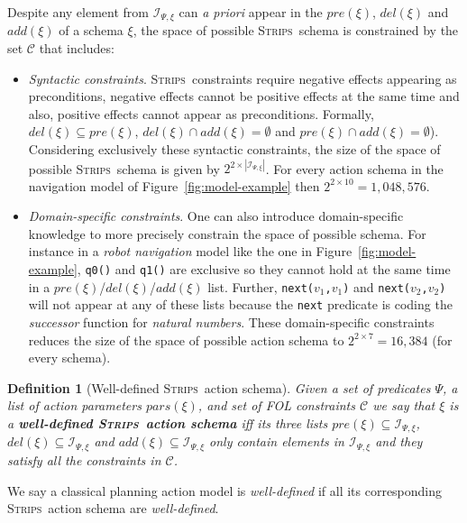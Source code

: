 \documentclass[letterpaper]{article} %
\newcommand{\strips}{\textsc{Strips}}     %
\newtheorem{definition}[theorem]{Definition}
\begin{document}
Despite any element from ${\mathcal I}_{\Psi,\xi}$ can {\em a priori} appear in the $pre(\xi)$, $del(\xi)$ and $add(\xi)$ of a schema $\xi$, the space of possible \strips\ schema is constrained by the set ${\mathcal C}$ that includes: 
\begin{itemize}
\item {\em Syntactic constraints}. \strips\ constraints require negative effects appearing as preconditions, negative effects cannot be positive effects at the same time and also, positive effects cannot appear as preconditions. Formally, $del(\xi)\subseteq pre(\xi)$, $del(\xi)\cap add(\xi)=\emptyset$ and $pre(\xi)\cap add(\xi)=\emptyset$). Considering exclusively these syntactic constraints, the size of the space of possible \strips\ schema is given by $2^{2\times|{\mathcal I}_{\Psi,\xi}|}$. For every action schema in the navigation model of Figure~\ref{fig:model-example} then $2^{2\times 10}=1,048,576$.
\item {\em Domain-specific constraints}. One can also introduce domain-specific knowledge to more precisely constrain the space of possible schema. For instance in a {\em robot navigation} model like the one in Figure~\ref{fig:model-example}, {\small\tt q0()} and {\small\tt q1()} are exclusive so they cannot hold at the same time in a $pre(\xi)$/$del(\xi)$/$add(\xi)$ list. Further, {\small\tt next($v_1$,$v_1$)} and {\small\tt next($v_2$,$v_2$)} will not appear at any of these lists because the {\tt\small next} predicate is coding the {\em successor} function for {\em natural numbers}. These domain-specific constraints reduces the size of the space of possible action schema to $2^{2\times 7}=16,384$ (for every schema).
\end{itemize}

\begin{definition}[Well-defined \strips\ action schema]
Given a set of {\em predicates} $\Psi$, a list of action {\em parameters} $pars(\xi)$, and set of FOL constraints ${\mathcal C}$ we say that $\xi$ is a {\bf well-defined \strips\ action schema} iff its three lists $pre(\xi)\subseteq {\mathcal I}_{\Psi,\xi}$, $del(\xi)\subseteq{\mathcal I}_{\Psi,\xi}$ and $add(\xi)\subseteq{\mathcal I}_{\Psi,\xi}$ only contain elements in ${\mathcal I}_{\Psi,\xi}$ and they satisfy all the constraints in ${\mathcal C}$. 
\end{definition}
We say a classical planning action model is {\em well-defined} if all its corresponding  \strips\ action schema are {\em well-defined}.
\end{document}
